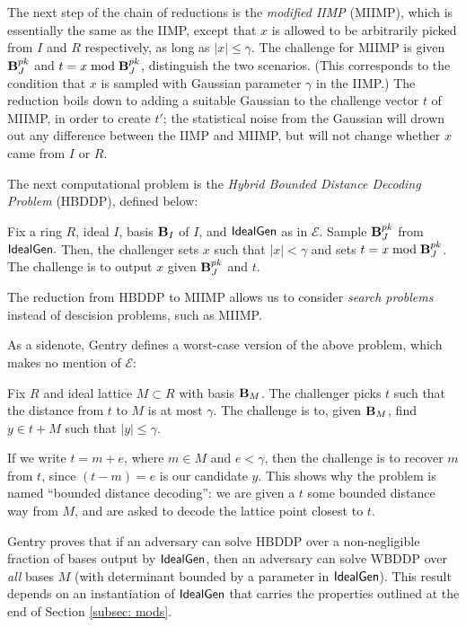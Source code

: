         The next step of the chain of reductions is the \emph{modified IIMP} (MIIMP), which is essentially the same as the IIMP, except that $x$ is allowed to be arbitrarily picked from $I$ and $R$ respectively, as long as $|x| \leq \gamma$. The challenge for MIIMP is given $\textbf{B}_J^{pk}$ and $t = x \bmod \textbf{B}_J^{pk}$, distinguish the two scenarios. (This corresponds to the condition that $x$ is sampled with Gaussian parameter $\gamma$ in the IIMP.) The reduction boils down to adding a suitable Gaussian to the challenge vector $t$ of MIIMP, in order to create $t'$; the statistical noise from the Gaussian will drown out any difference between the IIMP and MIIMP, but will not change whether $x$ came from $I$ or $R$.

        \vspace{2em}

        The next computational problem is the \emph{Hybrid Bounded Distance Decoding Problem} (HBDDP), defined below:
        \begin{definition} 
            Fix a ring $R$, ideal $I$, basis $\textbf{B}_I$ of $I$, and ${\sf IdealGen}$ as in $\mathcal{E}$. Sample $\textbf{B}_J^{pk}$ from ${\sf IdealGen}.$ Then, the challenger sets $x$ such that $|x| < \gamma$ and sets $t = x \bmod \textbf{B}_J^{pk}$. The challenge is to output $x$ given $\textbf{B}_J^{pk}$ and $t$.
        \end{definition}

        The reduction from HBDDP to MIIMP allows us to consider \emph{search problems} instead of descision problems, such as MIIMP.

        As a sidenote, Gentry defines a worst-case version of the above problem, which makes no mention of $\mathcal{E}$:
        \begin{definition} 
            Fix $R$ and ideal lattice $M \subset R$ with basis $\textbf{B}_M$. The challenger picks $t$ such that the distance from $t$ to $M$ is at most $\gamma$. The challenge is to, given $\textbf{B}_M$, find $y \in t + M$ such that $|y| \leq \gamma$.
        \end{definition}

        If we write $t = m + e$, where $m \in M$ and $e < \gamma$, then the challenge is to recover $m$ from $t$, since $(t - m) = e$ is our candidate $y$. This shows why the problem is named ``bounded distance decoding'': we are given a $t$ some bounded distance way from $M$, and are asked to decode the lattice point closest to $t$.

        Gentry proves that if an adversary can solve HBDDP over a non-negligible fraction of bases output by ${\sf IdealGen}$, then an adversary can solve WBDDP over \emph{all} bases $M$ (with determinant bounded by a parameter in ${\sf IdealGen}$). This result depends on an instantiation of ${\sf IdealGen}$ that carries the properties outlined at the end of Section \ref{subsec: mods}.

